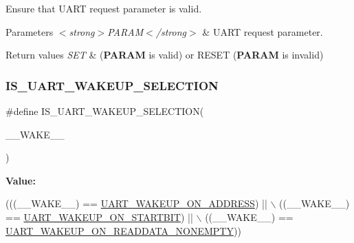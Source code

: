 Ensure that U\+A\+RT request parameter is valid. 


\begin{DoxyParams}{Parameters}
{\em $<$strong$>$\+P\+A\+R\+A\+M$<$/strong$>$} & U\+A\+RT request parameter. \\
\hline
\end{DoxyParams}

\begin{DoxyRetVals}{Return values}
{\em S\+ET} & ({\bfseries P\+A\+R\+AM} is valid) or R\+E\+S\+ET ({\bfseries P\+A\+R\+AM} is invalid) \\
\hline
\end{DoxyRetVals}
\mbox{\label{group___u_a_r_t_ex___private___macros_gaab6d7b59cffaf070ac3db100c76f4654}} 
\subsubsection{\texorpdfstring{I\+S\+\_\+\+U\+A\+R\+T\+\_\+\+W\+A\+K\+E\+U\+P\+\_\+\+S\+E\+L\+E\+C\+T\+I\+ON}{IS\_UART\_WAKEUP\_SELECTION}}
{\footnotesize\ttfamily \#define I\+S\+\_\+\+U\+A\+R\+T\+\_\+\+W\+A\+K\+E\+U\+P\+\_\+\+S\+E\+L\+E\+C\+T\+I\+ON(\begin{DoxyParamCaption}\item[{}]{\+\_\+\+\_\+\+W\+A\+K\+E\+\_\+\+\_\+ }\end{DoxyParamCaption})}

{\bfseries Value\+:}
\begin{DoxyCode}
(((\_\_WAKE\_\_) == \hyperlink{group___u_a_r_t___wake_up__from___stop___selection_ga926f94a665ed3d200e76aeb01f2ae275}{UART\_WAKEUP\_ON\_ADDRESS}) || \(\backslash\)
                                            ((\_\_WAKE\_\_) == 
      \hyperlink{group___u_a_r_t___wake_up__from___stop___selection_gade5095181db7434078e904af198c1699}{UART\_WAKEUP\_ON\_STARTBIT}) || \(\backslash\)
                                            ((\_\_WAKE\_\_) == 
      \hyperlink{group___u_a_r_t___wake_up__from___stop___selection_ga77464f7eaba9f0a34876b1df36b8292e}{UART\_WAKEUP\_ON\_READDATA\_NONEMPTY}))
\end{DoxyCode}


